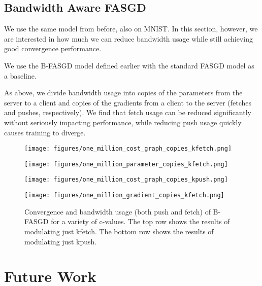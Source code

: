 \documentclass{article} %
\begin{document}
\subsection{Bandwidth Aware FASGD}

We use the same model from before, also on MNIST.
In this section, however, we are interested in how much we can reduce bandwidth
usage while still achieving good convergence performance.

We use the B-FASGD model defined earlier with the standard FASGD model as a baseline.

As above, we divide bandwidth usage into copies of the parameters from the server to a client and
copies of the gradients from a client to the server (fetches and pushes, respectively).
We find that fetch usage can be reduced significantly without seriously impacting performance,
while reducing push usage quickly causes training to diverge.


\begin{figure}[ht!]
  \centering
  \begin{minipage}[b]{0.5\linewidth}
    \texttt{[image: figures/one\_million\_cost\_graph\_copies\_kfetch.png]}
  \end{minipage}%
  \begin{minipage}[b]{0.5\linewidth}
    \texttt{[image: figures/one\_million\_parameter\_copies\_kfetch.png]}
  \end{minipage} 
  \begin{minipage}[b]{0.5\linewidth}
    \texttt{[image: figures/one\_million\_cost\_graph\_copies\_kpush.png]}
  \end{minipage}%
  \begin{minipage}[b]{0.5\linewidth}
    \texttt{[image: figures/one\_million\_gradient\_copies\_kfetch.png]}
  \end{minipage}%
  \caption{
    Convergence and bandwidth usage (both push and fetch)
    of B-FASGD for a variety of c-values.
    The top row shows the results of modulating just kfetch.
    The bottom row shows the results of modulating just kpush.
  }
  \label{fig2} 
\end{figure}

\vspace{-2.5mm}
\section{Future Work}
\vspace{-1mm}
\end{document}
